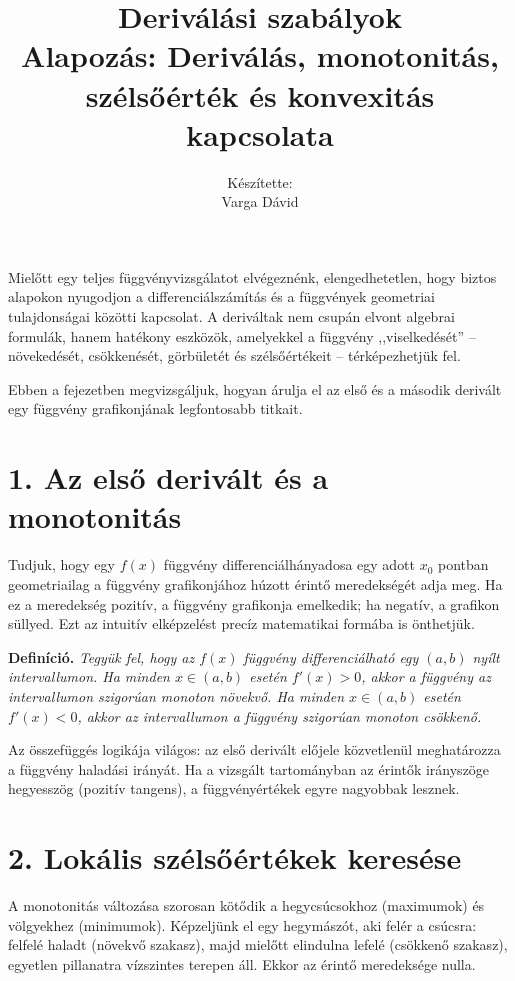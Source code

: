 \documentclass[12pt,a4paper]{article}
\author{}
\newcommand{\textbfr}[1]{\textbf{\textcolor{bvred}{#1}}}
\begin{document}
\title{\textbfr{Deriválási szabályok}\\[0.5ex]
\large Alapozás: Deriválás, monotonitás, szélsőérték és konvexitás kapcsolata}
\author{Készítette:\\Varga Dávid}
\date{}
\maketitle

Mielőtt egy teljes függvényvizsgálatot elvégeznénk, elengedhetetlen, hogy biztos alapokon nyugodjon a differenciálszámítás és a függvények geometriai tulajdonságai közötti kapcsolat. A deriváltak nem csupán elvont algebrai formulák, hanem hatékony eszközök, amelyekkel a függvény ,,viselkedését'' – növekedését, csökkenését, görbületét és szélsőértékeit – térképezhetjük fel. 

Ebben a fejezetben megvizsgáljuk, hogyan árulja el az első és a második derivált egy függvény grafikonjának legfontosabb titkait.

\section*{1. Az első derivált és a monotonitás}

Tudjuk, hogy egy $f(x)$ függvény differenciálhányadosa egy adott $x_0$ pontban geometriailag a függvény grafikonjához húzott érintő meredekségét adja meg. Ha ez a meredekség pozitív, a függvény grafikonja emelkedik; ha negatív, a grafikon süllyed. Ezt az intuitív elképzelést precíz matematikai formába is önthetjük.

\textbf{Definíció.} \textit{Tegyük fel, hogy az $f(x)$ függvény differenciálható egy $(a,b)$ nyílt intervallumon. Ha minden $x \in (a,b)$ esetén $f'(x) > 0$, akkor a függvény az intervallumon \textcolor{bvred}{szigorúan monoton növekvő}. Ha minden $x \in (a,b)$ esetén $f'(x) < 0$, akkor az intervallumon a függvény \textcolor{bvred}{szigorúan monoton csökkenő}.}

Az összefüggés logikája világos: az első derivált előjele közvetlenül meghatározza a függvény haladási irányát. Ha a vizsgált tartományban az érintők irányszöge hegyesszög (pozitív tangens), a függvényértékek egyre nagyobbak lesznek.

\section*{2. Lokális szélsőértékek keresése}

A monotonitás változása szorosan kötődik a hegycsúcsokhoz (maximumok) és völgyekhez (minimumok). Képzeljünk el egy hegymászót, aki felér a csúcsra: felfelé haladt (növekvő szakasz), majd mielőtt elindulna lefelé (csökkenő szakasz), egyetlen pillanatra vízszintes terepen áll. Ekkor az érintő meredeksége nulla.
\end{document}

